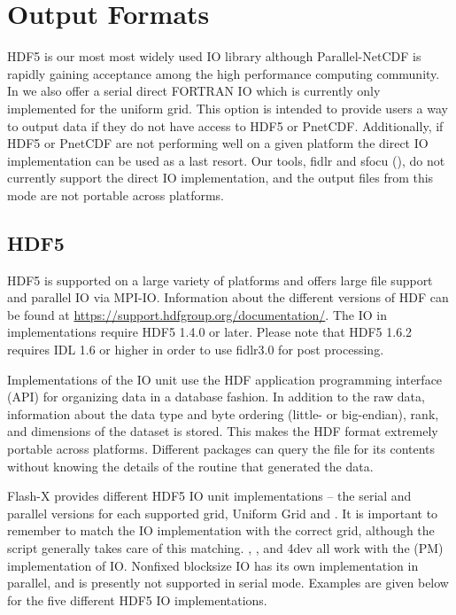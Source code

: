 \section{Output Formats}\label{Sec:Output formats}


HDF5 is our most most widely used IO library although
Parallel-NetCDF is rapidly gaining acceptance among the high
performance computing community.  In \flashx we also offer a serial
direct FORTRAN IO which is currently only implemented for the
uniform grid.  This option is intended to provide users a way to output data
if they do not have access to HDF5 or PnetCDF.  Additionally,
if HDF5 or PnetCDF are not performing well on a given platform the
direct IO implementation can be used as a last resort.  Our tools,
fidlr and sfocu (), do not currently support the
direct IO implementation, and the output files from this mode are not portable
across platforms.



\subsection{HDF5}
\label{Sec:HDF5}
HDF5%
is supported on a large variety of platforms and
offers large file support and parallel IO via MPI-IO.  Information
about the different versions of HDF can be found at
\url{https://support.hdfgroup.org/documentation/}.
The IO in \flashx
implementations require HDF5 1.4.0 or later.  Please note that HDF5
1.6.2 requires IDL 1.6 or higher in order to use fidlr3.0 for post processing.


Implementations of the %
\unit{IO} unit use the
HDF application programming interface (API) for organizing data in a
database fashion.  In addition to the raw data, information about the
data type and byte ordering (little- or big-endian), rank, and
dimensions of the dataset is stored.  This makes the HDF format
extremely portable across platforms.  Different packages can query the
file for its contents without knowing the details of the routine that
generated the data.



Flash-X provides different HDF5 IO unit implementations -- the serial
and parallel versions for each supported grid, Uniform Grid and
\Paramesh. It is important to remember to match the IO
implementation with the correct grid, although the  script generally
takes care of this matching.   , , and \Paramesh4dev all work
with the \Paramesh (PM) implementation of IO.  Nonfixed blocksize IO has 
its own implementation in parallel, and is presently not supported in serial
mode.
Examples are given below for the five different HDF5 IO implementations.

